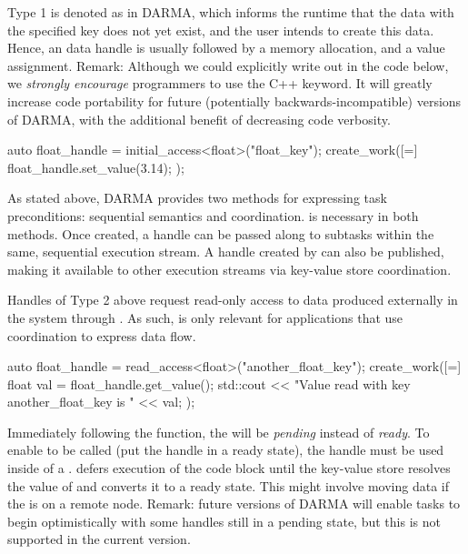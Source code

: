 Type 1 is denoted as  in DARMA, 
which informs the runtime that the data with the 
specified key does not yet exist, and the user intends to 
create this data.
Hence, an  data handle is usually 
followed by a memory allocation, and a value assignment. 
Remark: Although we could explicitly write out  in the code below,
we \emph{strongly encourage} programmers to use the C++  keyword.
It will greatly increase code portability for future (potentially backwards-incompatible) versions of DARMA,
with the additional benefit of decreasing code verbosity.

\begin{CppCode}
auto float_handle = initial_access<float>("float_key");
create_work([=]{
  float_handle.set_value(3.14);
});
\end{CppCode}
As stated above, DARMA provides two methods for expressing task preconditions: sequential semantics and coordination.
 is necessary in both methods.
Once created, a handle can be passed along to subtasks within the same, sequential execution stream.
A handle created by  can also be published, making it available to other execution streams via key-value store coordination.


Handles of Type 2 above request read-only access to data produced externally in the system through . 
As such,  is only relevant for applications that use coordination to express data flow.
\begin{CppCode}
auto float_handle = read_access<float>("another_float_key");
create_work([=]{
  float val = float_handle.get_value();
  std::cout << "Value read with key another_float_key is " << val;  
});
\end{CppCode}
Immediately following the  function, the \ahandle will be \emph{pending} instead of \emph{ready}.
To enable  to be called (put the handle in a ready state), the handle must be used inside of a .
\cwork defers execution of the code block until the key-value store resolves the value of  and converts it to a ready state.
This might involve moving data if the  is on a remote node.
Remark: future versions of DARMA will enable tasks to begin optimistically with some handles still in a pending state, but this is not supported in the current version.
 

